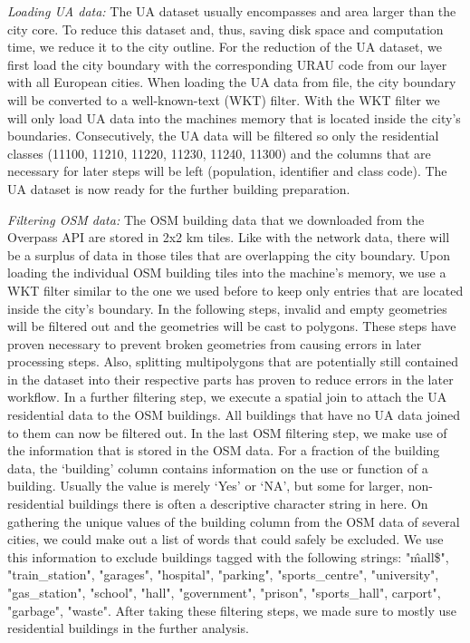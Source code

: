 \documentclass[10pt]{article}
\begin{document}
\textit{Loading UA data:} The UA dataset usually encompasses and area larger than the city core. To reduce this dataset and, thus, saving disk space and computation time, we reduce it to the city outline. For the reduction of the UA dataset, we first load the city boundary with the corresponding URAU code from our layer with all European cities. When loading the UA data from file, the city boundary will be converted to a well-known-text (WKT) filter. With the WKT filter we will only load UA data into the machines memory that is located inside the city’s boundaries. Consecutively, the UA data will be filtered so only the residential classes (11100, 11210, 11220, 11230, 11240, 11300) and the columns that are necessary for later steps will be left (population, identifier and class code). The UA dataset is now ready for the further building preparation.

\textit{Filtering OSM data:} The OSM building data that we downloaded from the Overpass API are stored in 2x2 km tiles. Like with the network data, there will be a surplus of data in those tiles that are overlapping the city boundary. Upon loading the individual OSM building tiles into the machine’s memory, we use a WKT filter similar to the one we used before to keep only entries that are located inside the city’s boundary. In the following steps, invalid and empty geometries will be filtered out and the geometries will be cast to polygons. These steps have proven necessary to prevent broken geometries from causing errors in later processing steps. Also, splitting multipolygons that are potentially still contained in the dataset into their respective parts has proven to reduce errors in the later workflow. In a further filtering step, we execute a spatial join to attach the UA residential data to the OSM buildings. All buildings that have no UA data joined to them can now be filtered out. In the last OSM filtering step, we make use of the information that is stored in the OSM data. For a fraction of the building data, the ‘building’ column contains information on the use or function of a building. Usually the value is merely ‘Yes’ or ‘NA’, but some for larger, non-residential buildings there is often a descriptive character string in here. On gathering the unique values of the building column from the OSM data of several cities, we could make out a list of words that could safely be excluded. We use this information to exclude buildings tagged with the following strings: "\^ mall\$", "train\_station", "garages", "hospital", "parking", "sports\_centre", "university", "gas\_station", "school", "hall", "government", "prison", "sports\_hall", carport", "garbage", "waste". After taking these filtering steps, we made sure to mostly use residential buildings in the further analysis.
\end{document}
